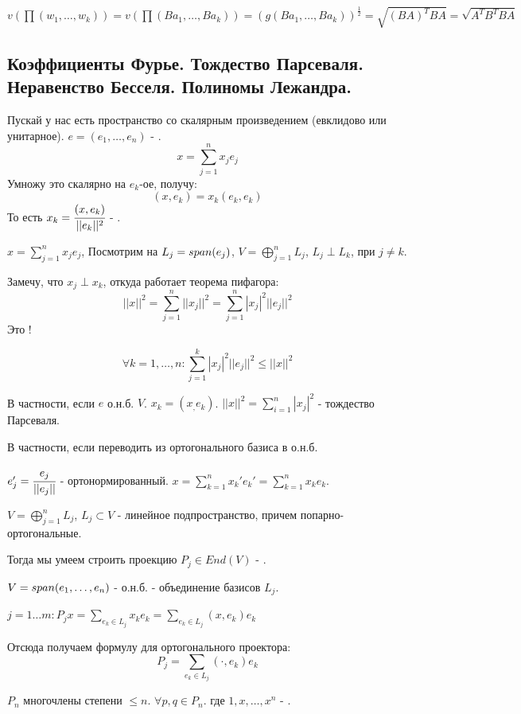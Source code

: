$v(\prod (w_1,\ldots, w_k)) =v(\prod(Ba_1,\ldots, Ba_k))= (g(Ba_1,\ldots, Ba_k))^{\frac{1}{2}} =\sqrt{(BA)^T BA} = \sqrt{A^TB^TBA}$
\pagebreak
\subsection{Коэффициенты Фурье. Тождество Парсеваля.  Неравенство Бесселя. Полиномы Лежандра.}

Пускай у нас есть пространство со скалярным произведением (евклидово или унитарное). $e =(e_1,\ldots, e_n)$ - .
$$x = \sum\limits_{j=1}^n x_je_j$$
Умножу это скалярно на $e_k$-ое, получу:
$$(x,e_k) = x_k (e_k,e_k)$$
То есть $x_k = \cfrac{(x,e_k)}{||e_k||^2}$ - .

$x = \sum\limits_{j=1}^n x_j e_j$, Посмотрим на $L_j = span(e_j)$, $V = \bigoplus\limits_{j=1}^nL_j$, $L_j \perp L_k$, при $j\neq k$.

Замечу, что $x_j\perp x_k$, откуда работает теорема пифагора:
$$||x||^2 =\sum\limits_{j=1}^n ||x_j||^2 = \sum\limits_{j=1}^n |x_j|^2 ||e_j||^2$$ 
Это !

$$\forall k =1,\ldots, n: \sum\limits_{j=1}^k |x_j|^2||e_j||^2\leq ||x||^2$$

В частности, если $e$ о.н.б. $V$. $x_k = (x_,e_k)$. $||x||^2 = \sum\limits_{i=1}^n |x_j|^2$ - тождество Парсеваля.

В частности, если переводить из ортогонального базиса в о.н.б. 

$e_j' = \cfrac{e_j}{||e_j||}$ - ортонормированный. $x = \sum\limits_{k=1}^n x_k' e_k' = \sum\limits_{k=1}^n x_k e_k$.

 $V =\bigoplus\limits_{j=1}^n L_j$, $L_j \subset V$ - линейное подпространство, причем попарно-ортогональные. 

Тогда мы умеем строить проекцию $P_j \in End(V)$ - .

$V = span (e_1,\ldots ,e_n)$ - о.н.б. - объединение базисов $L_j$.

$j = 1\ldots m: P_j x = \sum\limits_{e_k \in L_j}x_k e_k = \sum\limits_{e_k\in L_j}(x,e_k)e_k$

Отсюда получаем формулу для ортогонального проектора:
$$P_j  = \sum\limits_{e_k\in L_j} (\cdot , e_k)e_k$$


$P_n$ многочлены степени $\leq n$. $\forall p,q \in P_n$. где $1, x , \ldots, x^n$ - .

